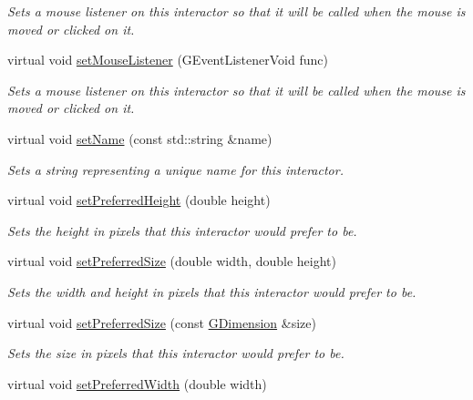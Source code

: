 \begin{DoxyCompactItemize}
\begin{DoxyCompactList}\small\item\em Sets a mouse listener on this interactor so that it will be called when the mouse is moved or clicked on it. \end{DoxyCompactList}\item 
virtual void \mbox{\hyperlink{classGInteractor_aea7f647ea62d59f71b5fad6aa65eeaf9}{set\+Mouse\+Listener}} (G\+Event\+Listener\+Void func)
\begin{DoxyCompactList}\small\item\em Sets a mouse listener on this interactor so that it will be called when the mouse is moved or clicked on it. \end{DoxyCompactList}\item 
virtual void \mbox{\hyperlink{classGInteractor_a9d3a2685df23b5e7cbf59c19c4a1f9b5}{set\+Name}} (const std\+::string \&name)
\begin{DoxyCompactList}\small\item\em Sets a string representing a unique name for this interactor. \end{DoxyCompactList}\item 
virtual void \mbox{\hyperlink{classGInteractor_a1ab987704fce32098706c6f00fb08218}{set\+Preferred\+Height}} (double height)
\begin{DoxyCompactList}\small\item\em Sets the height in pixels that this interactor would prefer to be. \end{DoxyCompactList}\item 
virtual void \mbox{\hyperlink{classGInteractor_a042c5ae19430d765ef552371cae3632c}{set\+Preferred\+Size}} (double width, double height)
\begin{DoxyCompactList}\small\item\em Sets the width and height in pixels that this interactor would prefer to be. \end{DoxyCompactList}\item 
virtual void \mbox{\hyperlink{classGInteractor_aa22d9be4bc0e078bb0ea69b0fc9d7c75}{set\+Preferred\+Size}} (const \mbox{\hyperlink{structGDimension}{G\+Dimension}} \&size)
\begin{DoxyCompactList}\small\item\em Sets the size in pixels that this interactor would prefer to be. \end{DoxyCompactList}\item 
virtual void \mbox{\hyperlink{classGInteractor_a3db429ab2fa52efd187eec0ed8cdd9f2}{set\+Preferred\+Width}} (double width)

\end{DoxyCompactItemize}
